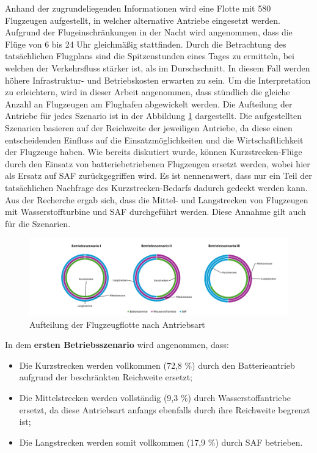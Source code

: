 Anhand der zugrundeliegenden Informationen wird eine Flotte mit 580 Flugzeugen aufgestellt, 
in welcher alternative Antriebe eingesetzt werden.
Aufgrund der Flugeinschränkungen in der Nacht wird angenommen, 
dass die Flüge von 6 bis 24 Uhr gleichmäßig stattfinden. 
%
Durch die Betrachtung des tatsächlichen Flugplans sind die Spitzenstunden eines Tages zu ermitteln, 
bei welchen der Verkehrsfluss stärker ist, als im Durschschnitt.
In diesem Fall werden höhere Infrastruktur- und Betriebskosten erwarten zu sein.
Um die Interpretation zu erleichtern, wird in dieser Arbeit angenommen, 
dass stündlich die gleiche Anzahl an Flugzeugen am Flughafen abgewickelt werden. 
%
Die Aufteilung der Antriebe für jedes Szenario ist in der Abbildung \ref{betriebsszenarien} dargestellt.
Die aufgestellten Szenarien basieren auf der Reichweite der jeweiligen Antriebe, 
da diese einen entscheidenden Einfluss auf die Einsatzmöglichkeiten und 
die Wirtschaftlichkeit der Flugzeuge haben. 
Wie bereits diskutiert wurde, können Kurzstrecken-Flüge durch 
den Einsatz von batteriebetriebenen Flugzeugen ersetzt werden, 
wobei hier als Ersatz auf SAF zurückgegriffen wird. 
Es ist nennenswert, dass nur ein Teil der tatsächlichen Nachfrage des Kurzstrecken-Bedarfs 
dadurch gedeckt werden kann. 
Aus der Recherche ergab sich, dass die Mittel- und Langstrecken von Flugzeugen mit 
Wasserstoffturbine und SAF durchgeführt werden.
Diese Annahme gilt auch für die Szenarien.\\
%
\begin{figure}[h]
	\centering
	\includegraphics[width=1.0\linewidth]{Bilder/Betriebsszenarien.png}
	\caption[Betriebsszenarien]{Aufteilung der Flugzeugflotte nach Antriebsart}
	\label{betriebsszenarien}
\end{figure}
%
In dem \textbf{ersten Betriebsszenario} wird angenommen, dass:
\begin{itemize}
    \item Die Kurzstrecken werden vollkommen (72,8 \%) durch den Batterieantrieb aufgrund der beschränkten Reichweite ersetzt;
    \item Die Mittelstrecken werden vollständig (9,3 \%) durch Wasserstoffantriebe ersetzt, 
	da diese Antriebsart anfangs ebenfalls durch ihre Reichweite begrenzt ist;
    \item Die Langstrecken werden somit vollkommen (17,9 \%) durch SAF betrieben.
\end{itemize}

